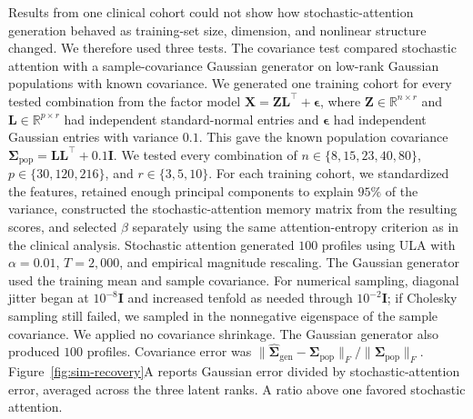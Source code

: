 Results from one clinical cohort could not show how stochastic-attention generation
behaved as training-set size, dimension, and nonlinear structure changed. We therefore used
three tests. The covariance test compared stochastic attention with a sample-covariance
Gaussian generator on low-rank Gaussian populations with known covariance. We generated one
training cohort for every tested combination from the factor model
$\mathbf{X}=\mathbf{Z}\mathbf{L}^{\top}+\boldsymbol{\epsilon}$, where
$\mathbf{Z}\in\mathbb{R}^{n\times r}$ and $\mathbf{L}\in\mathbb{R}^{p\times r}$ had
independent standard-normal entries and $\boldsymbol{\epsilon}$ had independent Gaussian
entries with variance $0.1$. This gave the known population covariance
$\boldsymbol{\Sigma}_{\mathrm{pop}}=\mathbf{L}\mathbf{L}^{\top}+0.1\mathbf{I}$. We tested
every combination of
$n\in\{8,15,23,40,80\}$, $p\in\{30,120,216\}$, and
$r\in\{3,5,10\}$. For each training cohort, we standardized the features, retained enough
principal components to explain $95\%$ of the variance, constructed the stochastic-attention
memory matrix from the resulting scores, and selected $\beta$ separately using the same
attention-entropy criterion as in the clinical analysis. Stochastic attention generated
$100$ profiles using ULA with $\alpha{=}0.01$, $T{=}2{,}000$, and empirical magnitude
rescaling. The Gaussian generator used the training mean and sample covariance. For numerical
sampling, diagonal jitter began at $10^{-8}\mathbf{I}$ and increased tenfold as needed through
$10^{-2}\mathbf{I}$; if Cholesky sampling still failed, we sampled in the nonnegative
eigenspace of the sample covariance. We applied no covariance shrinkage. The Gaussian
generator also produced $100$ profiles. Covariance error was
$\lVert\widehat{\boldsymbol{\Sigma}}_{\mathrm{gen}}-
\boldsymbol{\Sigma}_{\mathrm{pop}}\rVert_F/
\lVert\boldsymbol{\Sigma}_{\mathrm{pop}}\rVert_F$. Figure~\ref{fig:sim-recovery}A reports
Gaussian error divided by stochastic-attention error, averaged across the three latent ranks.
A ratio above one favored stochastic attention.

